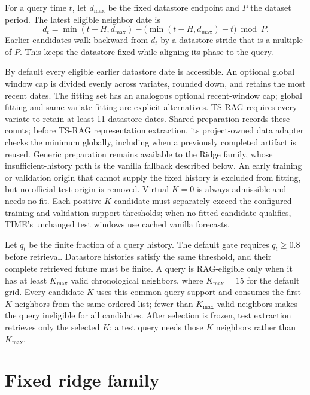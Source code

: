 \documentclass[10pt]{article}
\begin{document}
For a query time $t$, let $d_{\max}$ be the fixed datastore endpoint and $P$
the dataset period. The latest eligible neighbor date is
\begin{equation}
  d_t = \min(t-H,d_{\max})
        - \bigl(\min(t-H,d_{\max})-t\bigr) \bmod P.
\end{equation}
Earlier candidates walk backward from $d_t$ by a datastore stride that is a
multiple of $P$. This keeps the datastore fixed while aligning its phase to the
query.

By default every eligible earlier datastore date is accessible. An optional
global window cap is divided evenly across variates, rounded down, and retains
the most recent dates. The fitting set has an analogous optional recent-window
cap; global fitting and same-variate fitting are explicit alternatives. TS-RAG
requires every variate to retain at least 11
datastore dates. Shared preparation records these counts; before TS-RAG
representation extraction, its project-owned data adapter checks the minimum
globally, including when a previously completed artifact is reused. Generic
preparation remains available to the Ridge family, whose insufficient-history
path is the vanilla fallback described below.
An early training or validation origin that cannot supply the fixed history is
excluded from fitting, but no official test origin is removed. Virtual
$K=0$ is always admissible and needs no fit. Each positive-$K$ candidate must
separately exceed the configured training and validation support thresholds;
when no fitted candidate qualifies, TIME's unchanged test windows use cached
vanilla forecasts.

Let $q_t$ be the finite fraction of a query history. The default gate requires
$q_t\geq0.8$ before retrieval. Datastore histories satisfy the same threshold,
and their complete retrieved future must be finite. A query is RAG-eligible
only when it has at least $K_{\max}$ valid chronological neighbors, where
$K_{\max}=15$ for the default grid. Every candidate $K$ uses this common query
support and consumes the first $K$ neighbors from the same ordered list; fewer
than $K_{\max}$ valid neighbors makes the query ineligible for all candidates.
After selection is frozen, test extraction retrieves only the selected $K$;
a test query needs those $K$ neighbors rather than $K_{\max}$.

\section{Fixed ridge family}
\end{document}
